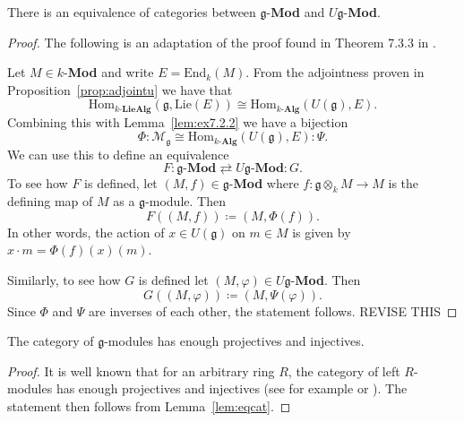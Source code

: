 \begin{proposition}
  \label{prop:gmodeq}
  There is an equivalence of categories between $ \mathfrak{g} $-\textbf{Mod} and $ U\mathfrak{g} $-\textbf{Mod}.
\end{proposition}
\begin{proof}
  The following is an adaptation of the proof found in Theorem 7.3.3 in \cite{weibel1994homological}.

  Let $ M \in k $-\textbf{Mod} and write $ E = \text{End}_k(M) $. From the adjointness proven in Proposition~\ref{prop:adjointu} we have that
  \begin{equation}
    \text{Hom}_{k\text{-}\mathbf{LieAlg}}(\mathfrak{g}, \text{Lie}(E)) \cong \text{Hom}_{k\text{-}\mathbf{Alg}}(U(\mathfrak{g}), E).
    \label{eq:adjointu}
  \end{equation}
  Combining this with Lemma~\ref{lem:ex7.2.2} we have a bijection
  \begin{equation}
    \Phi:\mathcal{M}_{\mathfrak{g}} \cong \text{Hom}_{k\text{-}\mathbf{Alg}}(U(\mathfrak{g}), E):\Psi.
  \end{equation}
  We can use this to define an equivalence
  \begin{equation}
    F:\mathfrak{g}\text{-}\mathbf{Mod} \rightleftarrows U\mathfrak{g}\text{-}\mathbf{Mod}:G.
  \end{equation}
  To see how $ F $ is defined, let $ (M, f) \in \mathfrak{g} $-\textbf{Mod} where $ f: \mathfrak{g} \otimes_k M \to M $ is the defining map of $ M $ as a $ \mathfrak{g} $-module. Then
  \begin{equation}
    F((M, f))\coloneqq (M, \Phi(f))
  .\end{equation}
  In other words, the action of $ x \in U(\mathfrak{g}) $ on $ m \in M $ is given by $ x\cdot m = \Phi(f)(x)(m) $.

  Similarly, to see how $ G $ is defined let $ (M, \varphi) \in U\mathfrak{g} $-\textbf{Mod}. Then
  \begin{equation}
    G((M, \varphi)) \coloneqq (M, \Psi(\varphi)).
  \end{equation}
  Since $ \Phi $ and $ \Psi $ are inverses of each other, the statement follows. REVISE THIS
\end{proof}

\begin{corollary}
  \label{cor:projinj}
  The category of $ \mathfrak{g} $-modules has enough projectives and injectives.
\end{corollary}
\begin{proof}
  It is well known that for an arbitrary ring $ R $, the category of left $ R $-modules has enough projectives and injectives (see for example \cite{Monnet2021} or \cite{weibel1994homological}). The statement then follows from Lemma~\ref{lem:eqcat}.
\end{proof}

